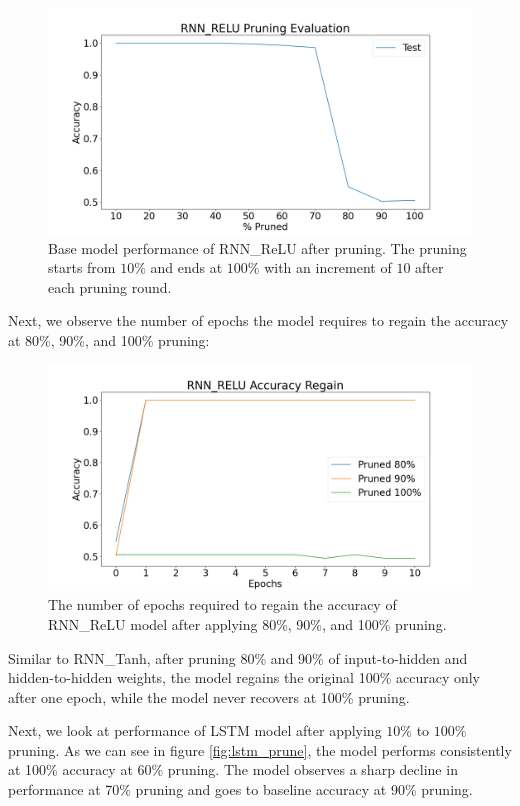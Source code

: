 \begin{figure}[h]
	\centering
	\includegraphics[width=0.8\linewidth]{images/results/pruning/rnn_relu_pruning_evaluation.png}
	\caption[RNN\_ReLU base model performance after pruning]%
	{Base model performance of RNN\_ReLU after pruning. The pruning starts from $10\%$ and ends at $100\%$ with an increment of $10$ after each pruning round.}
	\label{fig:rnn_relu_prune}
\end{figure}

Next, we observe the number of epochs the model requires to regain the accuracy at 80\%, 90\%, and 100\% pruning:

\begin{figure}[h]
	\centering
	\includegraphics[width=0.8\linewidth]{images/results/pruning/rnn_relu_accuracy_regain.png}
	\caption[RNN\_ReLU base model performance regain after pruning]%
	{The number of epochs required to regain the accuracy of RNN\_ReLU model after applying 80\%, 90\%, and 100\% pruning.}
	\label{fig:rnn_relu_prune_regain}
\end{figure}

Similar to RNN\_Tanh, after pruning 80\% and 90\% of input-to-hidden and hidden-to-hidden weights, the model regains the original 100\% accuracy only after one epoch, while the model never recovers at 100\% pruning.

Next, we look at performance of LSTM model after applying $10\%$ to $100\%$ pruning. As we can see in figure \ref{fig:lstm_prune}, the model performs consistently at 100\% accuracy at 60\% pruning. The model observes a sharp decline in performance at 70\% pruning and goes to baseline accuracy at 90\% pruning.

